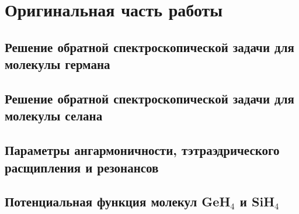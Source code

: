 \chapter{Оригинальная часть работы}\label{ch:original}

\section{Решение обратной спектроскопической задачи для молекулы германа}\label{sec:ch2/Ge}

\section{Решение обратной спектроскопической задачи для молекулы селана}\label{sec:ch2/Si}

\section{Параметры ангармоничности, тэтраэдрического расщипления и резонансов}\label{sec:ch2/params}

\section{Потенциальная функция молекул GeH$_4$ и SiH$_4$}\label{sec:ch2/pot-func}
